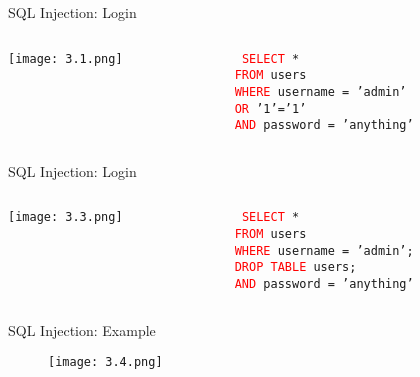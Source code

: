 \documentclass[t,ignorenonframetext]{beamer}
\begin{document}
\begin{frame}[fragile]{SQL Injection: Login}

\begin{columns}[T] %
    \begin{column}{0.48\linewidth} %
        \texttt{[image: 3.1.png]}
    \end{column}
    
    \begin{column}{0.48\linewidth} %
        \texttt{%
        \newline
        \newline
        \newline
        \textcolor{red}{SELECT} * \\
        \textcolor{red}{FROM} users \\
        \textcolor{red}{WHERE} username = 'admin' \\
        \textcolor{red}{OR} '1'='1' \\
        \textcolor{red}{AND} password = 'anything'
        }
    \end{column}
\end{columns}

\end{frame}


\begin{frame}[fragile]{SQL Injection: Login}

\begin{columns}[T] %
    \begin{column}{0.48\linewidth} %
        \texttt{[image: 3.3.png]}
    \end{column}
    
    \begin{column}{0.48\linewidth} %
        \texttt{%
        \newline
        \newline
        \newline
        \textcolor{red}{SELECT} * \\
        \textcolor{red}{FROM} users \\
        \textcolor{red}{WHERE} username = 'admin'; \\
        \textcolor{red}{DROP TABLE} users; \\
        \textcolor{red}{AND} password = 'anything'
        }
    \end{column}
\end{columns}

\end{frame}
\begin{frame}{SQL Injection: Example}
\begin{figure}[htb]
	\centering
	\texttt{[image: 3.4.png]}
\end{figure}

\end{frame}
\end{document}
